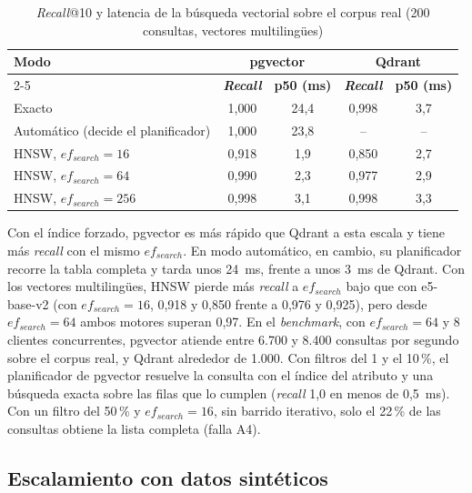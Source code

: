 \begin{table}[htbp!]
    \centering
    \caption{\textit{Recall}@10 y latencia de la búsqueda vectorial sobre el corpus real (200 consultas, vectores multilingües)}
    \label{tab:res-ann-real}
    \begin{tabular}{|l|c|c|c|c|}
        \hline
        \multirow{2}{*}{\textbf{Modo}} & \multicolumn{2}{c|}{\textbf{pgvector}} & \multicolumn{2}{c|}{\textbf{Qdrant}} \\
        \cline{2-5}
         & \textbf{\textit{Recall}} & \textbf{p50 (ms)} & \textbf{\textit{Recall}} & \textbf{p50 (ms)} \\
        \hline
        Exacto & 1{,}000 & 24,4 & 0{,}998 & 3,7 \\
        \hline
        Automático (decide el planificador) & 1{,}000 & 23,8 & -- & -- \\
        \hline
        HNSW, $ef_{search} = 16$ & 0{,}918 & 1,9 & 0{,}850 & 2,7 \\
        \hline
        HNSW, $ef_{search} = 64$ & 0{,}990 & 2,3 & 0{,}977 & 2,9 \\
        \hline
        HNSW, $ef_{search} = 256$ & 0{,}998 & 3,1 & 0{,}998 & 3,3 \\
        \hline
    \end{tabular}
\end{table}

Con el índice forzado, pgvector es más rápido que Qdrant a esta escala y tiene más \textit{recall} con el mismo $ef_{search}$. En modo automático, en cambio, su planificador recorre la tabla completa y tarda unos 24~ms, frente a unos 3~ms de Qdrant. Con los vectores multilingües, HNSW pierde más \textit{recall} a $ef_{search}$ bajo que con e5-base-v2 (con $ef_{search} = 16$, 0,918 y 0,850 frente a 0,976 y 0,925), pero desde $ef_{search} = 64$ ambos motores superan 0,97. En el \textit{benchmark}, con $ef_{search} = 64$ y 8 clientes concurrentes, pgvector atiende entre 6.700 y 8.400 consultas por segundo sobre el corpus real, y Qdrant alrededor de 1.000. Con filtros del 1 y el 10\,\%, el planificador de pgvector resuelve la consulta con el índice del atributo y una búsqueda exacta sobre las filas que lo cumplen (\textit{recall} 1,0 en menos de 0,5~ms). Con un filtro del 50\,\% y $ef_{search} = 16$, sin barrido iterativo, solo el 22\,\% de las consultas obtiene la lista completa (falla A4).

\subsection{Escalamiento con datos sintéticos}

